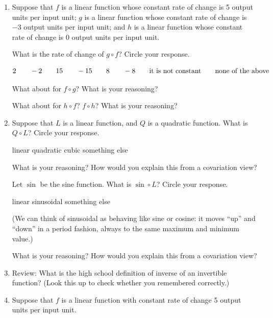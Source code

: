 \documentclass[11pt]{article}
\newcommand\tn{\textnormal}
\theoremstyle{definition}
\begin{document}
\begin{enumerate}
\item 
Suppose that $f$ is a linear function whose constant rate of change is 5 output units per input unit; $g$ is a linear function whose constant rate of change is $-3$ output units per input unit; and $h$ is a linear function whose constant rate of change is $0$ output units per input unit.

What is the rate of change of $g\circ f$? Circle your response.

	$$2 \quad\quad -2 \quad\quad 15 \quad\quad -15 \quad\quad 8 \quad\quad -8\quad\quad \tn{it is not constant} \quad\quad \tn{none of the above}$$

What about for $f\circ g$? What is your reasoning? 

What about for $h\circ f$?  $f\circ h$? What is your reasoning?

\vfill 

\item Suppose that $L$ is a linear function, and $Q$ is a quadratic function.  What is $Q\circ L$? Circle your response.


\begin{center}
linear \quad\quad quadratic \quad\quad cubic \quad\quad something else
\end{center}

What is your reasoning? How would you explain this from a covariation view?

Let $\sin$ be the sine function. What is $\sin\circ L$? Circle your response.

\begin{center}
linear \quad\quad sinusoidal \quad\quad something else
\end{center}

(We can think of sinusoidal as behaving like sine or cosine: it moves ``up'' and ``down'' in a period fashion, always to the same maximum and minimum value.)

What is your reasoning? How would you explain this from a covariation view?

\vfill 

\item Review: What is the high school definition of inverse of an invertible function? (Look this up to check whether you remembered correctly.)

\vfill 
\item Suppose that $f$ is a linear function with constant rate of change 5 output units per input unit. 


\end{enumerate}
\end{document}
